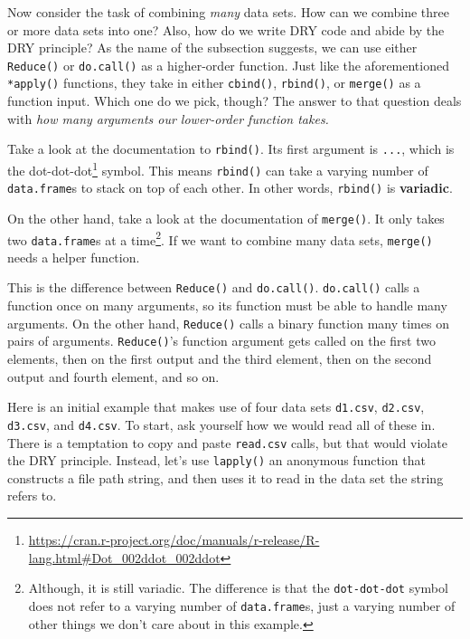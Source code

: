 \documentclass[12pt,krantz2]{krantz}
\renewcommand{\href}[2]{#2\footnote{\url{#1}}}
\begin{document}
Now consider the task of combining \emph{many} data sets. How can we combine three or more data sets into one? Also, how do we write DRY code and abide by the DRY principle? As the name of the subsection suggests, we can use either \texttt{Reduce()} or \texttt{do.call()} as a higher-order function. Just like the aforementioned \texttt{*apply()} functions, they take in either \texttt{cbind()}, \texttt{rbind()}, or \texttt{merge()} as a function input. Which one do we pick, though? The answer to that question deals with \emph{how many arguments our lower-order function takes.}

Take a look at the documentation to \texttt{rbind()}. Its first argument is \texttt{...}, which is the \href{https://cran.r-project.org/doc/manuals/r-release/R-lang.html\#Dot_002ddot_002ddot}{dot-dot-dot} symbol. This means \texttt{rbind()} can take a varying number of \texttt{data.frame}s to stack on top of each other. In other words, \texttt{rbind()} is \textbf{variadic}.

On the other hand, take a look at the documentation of \texttt{merge()}. It only takes two \texttt{data.frame}s at a time\footnote{Although, it is still variadic. The difference is that the \texttt{dot-dot-dot} symbol does not refer to a varying number of \texttt{data.frame}s, just a varying number of other things we don't care about in this example.}. If we want to combine many data sets, \texttt{merge()} needs a helper function.

This is the difference between \texttt{Reduce()} and \texttt{do.call()}. \texttt{do.call()} calls a function once on many arguments, so its function must be able to handle many arguments. On the other hand, \texttt{Reduce()} calls a binary function many times on pairs of arguments. \texttt{Reduce()}'s function argument gets called on the first two elements, then on the first output and the third element, then on the second output and fourth element, and so on.

Here is an initial example that makes use of four data sets \texttt{d1.csv}, \texttt{d2.csv}, \texttt{d3.csv}, and \texttt{d4.csv}. To start, ask yourself how we would read all of these in. There is a temptation to copy and paste \texttt{read.csv} calls, but that would violate the DRY principle. Instead, let's use \texttt{lapply()} an anonymous function that constructs a file path string, and then uses it to read in the data set the string refers to.
\end{document}
